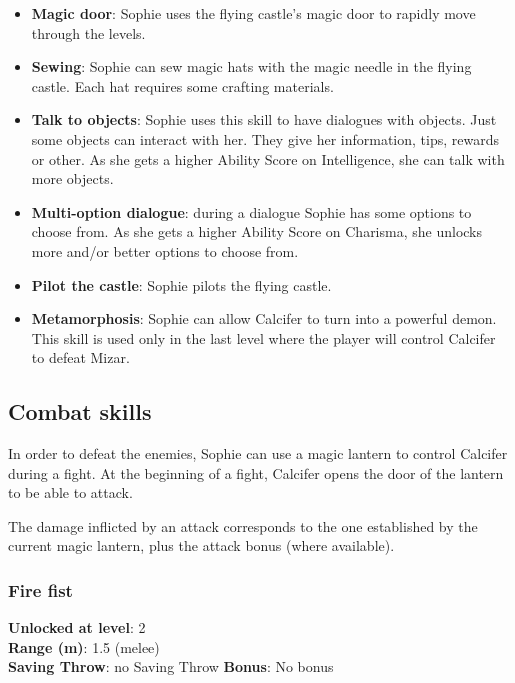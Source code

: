 \begin{itemize}
\item \textbf{Magic door}: Sophie uses the flying castle's magic door to rapidly move through the levels.
\item \textbf{Sewing}: Sophie can sew magic hats with the magic needle in the flying castle. Each hat requires some crafting materials.
\item \textbf{Talk to objects}: Sophie uses this skill to have dialogues with objects. Just some objects can interact with her. They give her information, tips, rewards or other. As she gets a higher Ability Score on Intelligence, she can talk with more objects.
\item \textbf{Multi-option dialogue}: during a dialogue Sophie has some options to choose from. As she gets a higher Ability Score on Charisma, she unlocks more and/or better options to choose from.
\item \textbf{Pilot the castle}: Sophie pilots the flying castle.
\item \textbf{Metamorphosis}: Sophie can allow Calcifer to turn into a powerful demon. This skill is used only in the last level where the player will control Calcifer to defeat Mizar.
\end{itemize}

\subsection{Combat skills}
In order to defeat the enemies, Sophie can use a magic lantern to control Calcifer during a fight. At the beginning of a fight, Calcifer opens the door of the lantern to be able to attack.

The damage inflicted by an attack corresponds to the one established by the current magic lantern, plus the attack bonus (where available).

\subsubsection{Fire fist}
\textbf{Unlocked at level}: 2 \\
\textbf{Range (m)}: 1.5 (melee) \\
\textbf{Saving Throw}: no Saving Throw
\textbf{Bonus}: No bonus

